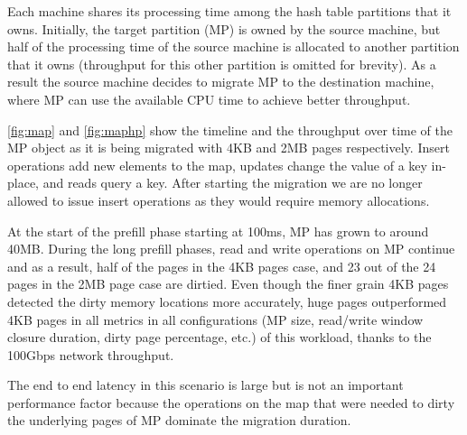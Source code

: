 Each machine shares its processing time among the hash table partitions that
it owns. Initially, the target partition (MP) is owned by the source machine, but half of
the processing time of the source machine is allocated to another partition that
it owns (throughput for this other partition is omitted for brevity). As a result
the source machine decides to migrate MP to the destination machine, where MP
can use the available CPU time to achieve better throughput.

\autoref{fig:map} and \autoref{fig:maphp} show the timeline and the throughput
over time of the MP object as it is being migrated with 4KB and 2MB pages
respectively. Insert operations add new elements to the map, updates change
the value of a key in-place, and reads query a key. After starting the migration
we are no longer allowed to issue insert operations as they would require
memory allocations.

At the start of the prefill phase starting at 100ms, MP has grown to around 40MB.
During the long prefill phases, read and write operations on MP continue and as
a result, half of the pages in the 4KB pages case, and 23 out of the 24 pages in the
2MB page case are dirtied. Even though the finer grain 4KB pages detected the
dirty memory locations more accurately, huge pages outperformed 4KB pages in all
metrics in all configurations (MP size, read/write window closure duration,
dirty page percentage, etc.) of this workload, thanks to the 100Gbps network
throughput.

The end to end latency in this scenario is large but is not an important
performance factor because the operations
on the map that were needed to dirty the underlying pages of MP dominate
the migration duration.



